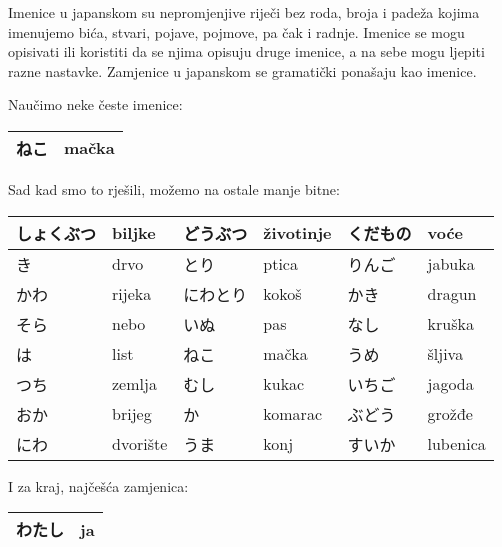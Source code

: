 
\author{Tomislav Mamić, Željka Ludošan}


	
	
	Imenice u japanskom su nepromjenjive riječi bez roda, broja i padeža kojima imenujemo bića, stvari, pojave, pojmove, pa čak i radnje. Imenice se mogu opisivati ili koristiti da se njima opisuju druge imenice, a na sebe mogu ljepiti razne nastavke. Zamjenice u japanskom se gramatički ponašaju kao imenice.

Naučimo neke česte imenice:
\vspace{10pt}

	\begin{tabular}{|l|l|}
		\hline
		ねこ&mačka\\\hline
	\end{tabular}
	\vspace{10pt}
	
	Sad kad smo to rješili, možemo na ostale manje bitne:
	
	\vspace{10pt}
	\begin{tabular}{|l|l|l||l||l||l|}
		\hline
		しょくぶつ&biljke&どうぶつ&životinje&くだもの&voće\\\hline
		き&drvo&とり&ptica&りんご&jabuka\\\hline
		かわ&rijeka&にわとり&kokoš&かき&dragun\\\hline
		そら&nebo&いぬ&pas&なし&kruška\\\hline
		は&list&ねこ&mačka&うめ&šljiva\\\hline
		つち&zemlja&むし&kukac&いちご&jagoda\\\hline
		おか&brijeg&か&komarac&ぶどう&grožđe\\\hline
		にわ&dvorište&うま&konj&すいか&lubenica\\\hline
	\end{tabular}

	
	\vspace{10pt}
	I za kraj, najčešća zamjenica:
	
	\vspace{10pt}
	\begin{tabular}{|l|l|}
		\hline
		わたし&ja\\\hline
	\end{tabular}
	\vspace{10pt}

